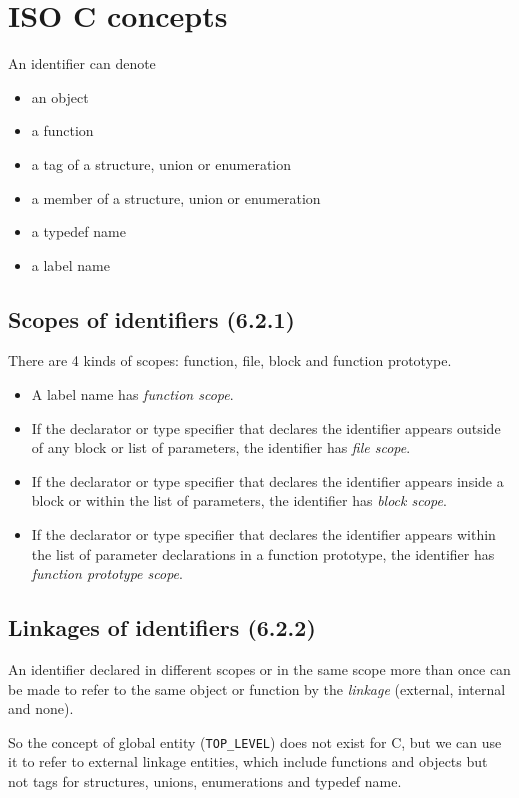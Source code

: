 \documentclass[a4paper]{report}
\begin{document}
\section{ISO C concepts}

An identifier can denote
\begin{itemize}
\item an object
\item a function
\item a tag of a structure, union or enumeration
\item a member of a structure, union or enumeration
\item a typedef name
\item a label name
\end{itemize}

\subsection{Scopes of identifiers (6.2.1)}

There are 4 kinds of scopes: function, file, block and function prototype.
\begin{itemize}
\item A label name has {\it function scope}.
\item If the declarator or type specifier that declares the identifier
  appears outside of any block or list of parameters, the identifier has
  {\it file scope}.
\item If the declarator or type specifier that declares the identifier
  appears inside a block or within the list of parameters, the identifier has
  {\it block scope}.
\item If the declarator or type specifier that declares the identifier
  appears within the list of parameter declarations in a function prototype, the identifier has
 {\it function prototype scope}.
\end{itemize}

\subsection{Linkages of identifiers (6.2.2)}

An identifier declared in different scopes or in the same scope more than
once can be made to refer to the same object or function by the {\it
  linkage} (external, internal and none). 

So the concept of global entity (\verb/TOP_LEVEL/) does not exist for C, but we
can use it to refer to external linkage entities, which include functions
and objects but not tags for structures, unions, enumerations and typedef
name. 
\end{document}

